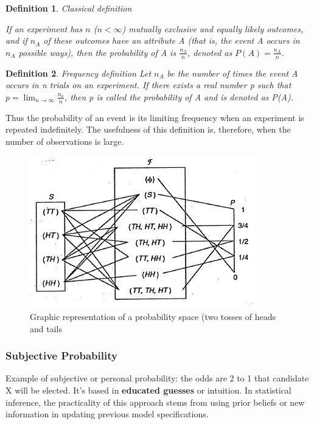 \documentclass{article}
\newtheorem{definition}{Definition}[section]
\begin{document}
\begin{definition}
Classical definition
    
If an experiment has \( n \) (\( n < \infty \)) mutually exclusive and equally likely outcomes, and if \( n_A \) of these outcomes have an attribute A (that is, the event A occurs in $n_A$ possible ways), then the probability of A is \( \frac{n_A}{n} \), denoted as \( P(A) = \frac{n_A}{n} \).
\end{definition}

\begin{definition}
Frequency definition
Let $n_A$ be the number of times the event A occurs in n trials on an experiment. If there exists a real number p such that \( p = \lim_{n \to \infty} \frac{n_a}{n} \), then p is called the probability of A and is denoted as P(A).
\end{definition}

Thus the probability of an event is its limiting frequency when an experiment is repeated indefinitely. The usefulness of this definition is, therefore, when the number of observations is large.
 \begin{figure} [h]
     \centering
     \includegraphics{pics/probability space.jpg}
     \caption{Graphic representation of a probability space (two tosses of heads and tails}
     \label{fig:enter-label54}
 \end{figure}

\subsubsection{Subjective Probability}

Example of subjective or personal probability: the odds are 2 to 1 that candidate X will be elected. It's based in \textbf{educated guesses} or intuition. In statistical inference, the practicality of this approach stems from using prior beliefs or new information in updating previous model specifications.
\end{document}
